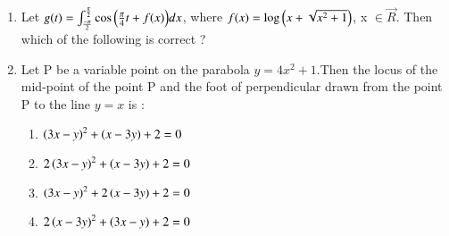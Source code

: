 \documentclass[journal,12pt,onecolumn]{IEEEtran}
\theoremstyle{remark}
\begin{document}
\begin{enumerate}
\begin{enumerate}
	 \end{enumerate}
 \item Let $ g(t) = \int_{\frac{- \pi}{2}}^{\frac{\pi}{2}} \cos{\ensuremath{\left(\frac{\pi}{4}t + f(x)\right)}} dx$, where $f(x) = \log{\ensuremath{\left(x + \sqrt{x^2 + 1}\right)}}$, x $\in \vec{R}$. Then which of the following is correct ?
	 \begin{enumerate}
	 \end{enumerate}
 \item Let P be a variable point on the parabola $y=4x^2+1$.Then the locus of the mid-point of the point P and the foot of perpendicular drawn from the point P to the line $y=x$ is :
	 \begin{enumerate}
		 \item $\left(3x-y\right)^2 + \left(x-3y\right) + 2 = 0$
		 \item $2 \left(3x-y\right)^2 + \left(x-3y\right) + 2 = 0$
		 \item $\left(3x-y\right)^2 + 2\left(x-3y\right) + 2 = 0$
		 \item $2 \left(x-3y\right)^2 + \left(3x-y\right) + 2 = 0$
	 \end{enumerate}
\end{enumerate}
\end{document}
